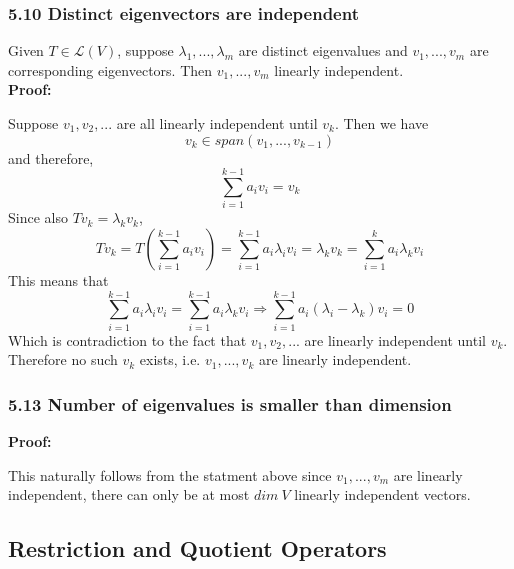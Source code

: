 \documentclass{article}
\begin{document}
\subsubsection*{5.10 Distinct eigenvectors are independent}
Given $T \in \mathcal{L}(V)$, suppose $\lambda_1, ..., \lambda_m$ are distinct eigenvalues and $v_1, ..., v_m$ are corresponding eigenvectors. Then $v_1, ..., v_m$ linearly independent.\\
\textbf{Proof:}
\begin{addmargin}[1em]{0em}
    Suppose $v_1, v_2, ...$ are all linearly independent until $v_k$. Then we have
    \begin{equation*}
        v_k \in span(v_1, ..., v_{k-1}) \tag*{5.11}
    \end{equation*}
    and therefore,
    \begin{equation*}
        \sum_{i=1}^{k-1} a_i v_i = v_k \tag*{5.12}
    \end{equation*}
    Since also $Tv_k = \lambda_k v_k$,
    \begin{equation*}
        Tv_k = T\left(
            \sum_{i=1}^{k-1} a_i v_i
        \right)
        = \sum_{i=1}^{k-1} a_i \lambda_i v_i = \lambda_k v_k = \sum_{i=1}^{k} a_i \lambda_k v_i
    \end{equation*}
    This means that
    \begin{equation*}
        \sum_{i=1}^{k-1} a_i \lambda_i v_i = \sum_{i=1}^{k-1} a_i \lambda_k v_i \Rightarrow \sum_{i=1}^{k-1} a_i (\lambda_i - \lambda_k) v_i = 0
    \end{equation*}
    Which is contradiction to the fact that $v_1, v_2, ...$ are linearly independent until $v_k$.\\
    Therefore no such $v_k$ exists, i.e. $v_1, ..., v_k$ are linearly independent.
\end{addmargin}
\subsubsection*{5.13 Number of eigenvalues is smaller than dimension}
\textbf{Proof:}
\begin{addmargin}[1em]{0em}
    This naturally follows from the statment above since $v_1, ..., v_m$ are linearly independent, there can only be at most $dim\ V$ linearly independent vectors.
\end{addmargin}
\subsection*{Restriction and Quotient Operators}
\end{document}
